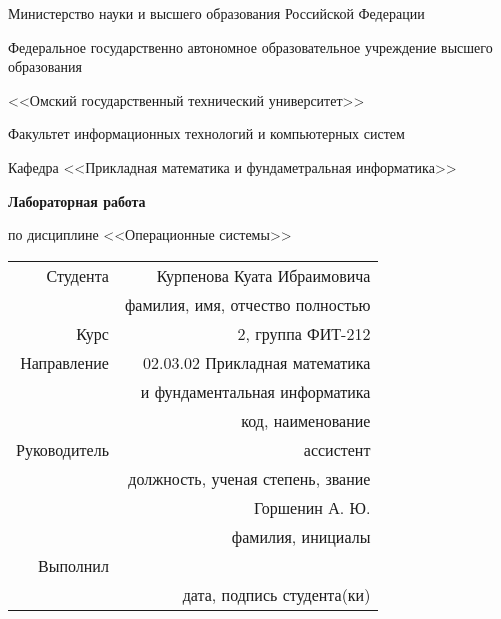 \usepackage{graphicx}
\graphicspath{{./images/}}


    \thispagestyle{empty}

    \begin{center}
        Министерство науки и высшего образования Российской Федерации

        Федеральное государственно автономное образовательное учреждение высшего образования

        <<Омский государственный технический университет>>

        \vspace{1cm}
        Факультет информационных технологий и компьютерных систем

        Кафедра <<Прикладная математика и фундаметральная информатика>>

        \vspace{3cm}
        \textbf{Лабораторная работа}

        по дисциплине <<Операционные системы>>
    \end{center}
    
    \vspace{3cm}
    \begin{flushright}    
        \begin{tabular}{ r r }
            Студента & Курпенова Куата Ибраимовича \\
            \cline{2-2}
            & \tiny{фамилия, имя, отчество полностью} \\

            Курс & 2, группа ФИТ-212 \\
            \cline{2-2}
            Направление & 02.03.02 Прикладная математика \\
            \cline{2-2}
            & и фундаментальная информатика \\
            \cline{2-2}
            & \tiny{код, наименование} \\

            Руководитель & ассистент \\
            \cline{2-2}
            & \tiny{должность, ученая степень, звание} \\
            & Горшенин А. Ю. \\
            \cline{2-2}
            & \tiny{фамилия, инициалы} \\

            Выполнил & \\
            \cline{2-2}
            & \tiny{дата, подпись студента(ки)} \\
        \end{tabular}
    \end{flushright}
    
